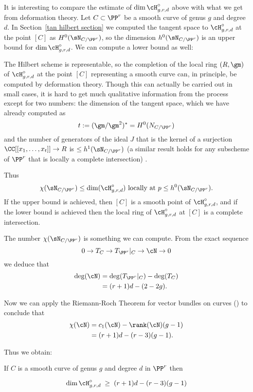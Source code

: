 It is interesting to compare the estimate of  $\dim \cH^\circ_{g,r,d}$ above with what we get from deformation theory. 
Let $C\subset \PP^r$ be a smooth curve of genus $g$ and degree $d$. In Section~\ref{tan hilbert section}
we computed the tangent space to $\cH^\circ_{g,r,d}$ at the point $[C]$ as $H^0(\sN_{C/\PP^r})$, so 
the dimension $h^0( \sN_{C/\PP^r})$ is an upper bound for $\dim \cH^\circ_{g,r,d}$. We can compute a lower bound as well:


\begin{fact}
 The Hilbert scheme is representable, so
the completion of the local ring $(R,\gm)$ of $\cH^\circ_{g,r,d}$ at the point $[C]$ representing a smooth curve can, in principle, be computed by deformation theory.
Though this can actually be carried out in small cases, it is hard to get much qualitative information from the process
except for two numbers: the dimension of the tangent space, which we have already computed as 
$$
t:= (\gm/\gm^2)^*  = H^0(N_{C/\PP^r})
$$
and the number of generators of the ideal $J$ that is the kernel of a surjection  $\CC[[ x_1,\dots, x_t]] \to R$
is $\leq h^1( \sN_{C/\PP^r}) $ (a similar result holds for any subscheme of $\PP^r$ that is locally a complete intersection)
\cite[Corollaries 6.2.5, 6.4.11 and Proposition 6.5.2]{MR2223408}. 

Thus 
$$
\chi(\sN_{C/\PP^r}) \leq \dim (\cH^\circ_{g,r,d})\hbox{ locally at } p\leq h^0(\sN_{C/\PP^r}).
$$
If the upper bound is achieved, then $[C]$ is a smooth point of $\cH^\circ_{g,r,d}$, and if the lower bound is achieved
then the local ring of $\cH^\circ_{g,r,d}$ at $[C]$ is a complete intersection.
\end{fact}

The number $\chi(\sN_{C/\PP^r})$ is something we can compute. From the exact sequence
$$
0 \to T_C \to T_{\PP^r}|_C \to \cN \to 0
$$
we deduce that
\begin{align*}
\deg(\cN) &= \deg(T_{\PP^r}|_C) - \deg(T_C) \\
&= (r+1)d - (2-2g).
\end{align*}

Now we can apply the Riemann-Roch Theorem for vector bundles on curves (\cite[Theorem ???]{3264}) to conclude that
\begin{align*}
\chi(\cN) &= c_1(\cN) - \rank(\cN)(g-1) \\
&= (r+1)d - (r-3)(g-1).
\end{align*}

Thus we obtain:
\begin{theorem}
 If $C$ is a smooth curve of genus $g$ and degree $d$ in $\PP^r$ then
\end{theorem}
$$
\dim \cH^\circ_{g,r,d} \; \geq \; (r+1)d - (r-3)(g-1)
$$

